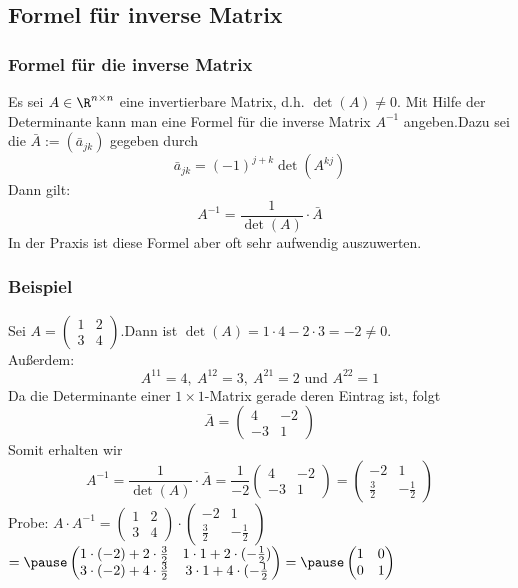 \subsection{Formel für inverse Matrix}
%
\begin{frame}\frametitle{Formel für die inverse Matrix}
Es sei $A \in \R^{n\times n}$ eine invertierbare Matrix, d.h. $\det(A)\ne 0$.
Mit Hilfe der Determinante kann man eine Formel für die inverse Matrix $A^{-1}$ angeben.\pause Dazu sei die  $\bar A := (\bar a_{jk})$ gegeben durch
$$
\bar a_{jk}=(-1)^{j+k}\det(A^{kj})
$$\pause
Dann gilt:
$$
A^{-1}=\frac{1}{\det(A)}\cdot \bar A
$$\pause\vfill
In der Praxis ist diese Formel aber oft sehr aufwendig auszuwerten.

\end{frame}
%
\begin{frame}\frametitle{Beispiel}
Sei $A=\begin{pmatrix} 1 & 2 \\ 3 & 4\end{pmatrix}$.\pause Dann ist $\det(A)=1\cdot 4 - 2 \cdot 3 =-2 \ne 0$.\\
Außerdem:
$$
A^{11}=4, \   A^{12}=3, \ A^{21}=2 \text{ und }  A^{22}=1
$$\pause
Da die Determinante einer $1\times1$-Matrix gerade deren Eintrag ist, folgt
$$
\bar A=\begin{pmatrix} 4 & -2 \\ -3 & 1\end{pmatrix}
$$\pause
Somit erhalten wir 
$$
A^{-1}=\frac{1}{\det(A)}\cdot \bar A=\frac{1}{-2}\begin{pmatrix} 4 & -2 \\ -3 & 1\end{pmatrix}=\begin{pmatrix}-2 & 1 \\ \frac{3}{2} & -\frac{1}{2}\end{pmatrix}
$$\pause
Probe: $A\cdot A^{-1}=\begin{pmatrix} 1 & 2 \\ 3 & 4\end{pmatrix} \cdot \begin{pmatrix}-2 & 1 \\ \frac{3}{2} & -\frac{1}{2}\end{pmatrix}$\\\hspace{24.5mm}$ =\pause\begin{pmatrix}1\cdot (-2)+2\cdot \frac{3}{2} & 1\cdot1 + 2\cdot(-\frac{1}{2}) \\ 3\cdot (-2)+4\cdot \frac{3}{2} & 3\cdot1+4\cdot(-\frac{1}{2}\end{pmatrix}=\pause\begin{pmatrix} 1 & 0 \\ 0 & 1\end{pmatrix}$
\end{frame}
%

